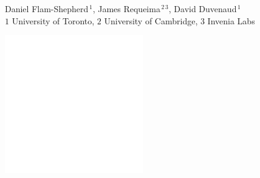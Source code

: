\documentclass[landscape,a1,final,a4resizeable]{include/a0poster}
\newcommand{\col}[1]{{\color{camLightBlue}\textbf{#1}}}%
\begin{document}
\begin{minipage}[t][0pt]{\linewidth}
{{\begin{center}
    \large Daniel Flam-Shepherd$^{\,1}$, James Requeima$^{\,2\,3}$, David Duvenaud$^{\,1}$\\
    \color{white}\large 
    $1$ University of Toronto, $2$ University of Cambridge, $3$ Invenia Labs
    \end{center}
  }%
\hspace{2cm}
\parbox{.05\textwidth}{  
  \begin{flushright}\vspace{-0.5cm}\includegraphics[height=6cm]{badges/inv_labs}\hfill%
  \end{flushright}}
}%



\begin{poster}%
\vspace{0\baselineskip}%
\vspace*{0.7cm}%
\large%
\noindent%

\begin{multicols}{3}


\begin{minipage}[t][47.5cm][t]{.32\textwidth}






\end{minipage}
\end{multicols}
\end{poster}
\end{minipage}
\end{document}
